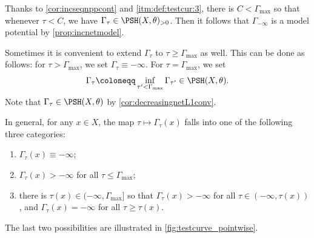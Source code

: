 Thanks to \cref{cor:incseqnppcont} and \ref{itm:def:testcur:3}, there is $C<\Gamma_{\max}$ so that whenever $\tau<C$, we have $\Gamma_{\tau}\in \PSH(X,\theta)_{>0}$. Then it follows that $\Gamma_{-\infty}$ is a model potential by \cref{prop:incnetmodel}.

\begin{remark}\label{rmk:extendtestcur}
    Sometimes it is convenient to extend $\Gamma_{\tau}$ to $\tau\geq \Gamma_{\max}$ as well. This can be done as follows: for $\tau>\Gamma_{\max}$, we set $\Gamma_{\tau}\equiv -\infty$. For $\tau=\Gamma_{\max}$, we set
    \[
        \Gamma_{\tau}\coloneqq \inf_{\tau'<\Gamma_{\max}}\Gamma_{\tau'}\in \PSH(X,\theta).
    \]
    Note that $\Gamma_{\tau}\in \PSH(X,\theta)$ by \cref{cor:decreasingnetL1conv}.
\end{remark}

In general, for any $x\in X$, the map $\tau\mapsto \Gamma_{\tau}(x)$ falls into one of the following three categories:
\begin{enumerate}
    \item\label{itm:Gammataux_1} $\Gamma_{\tau}(x)\equiv -\infty$;
    \item\label{itm:Gammataux_2} $\Gamma_{\tau}(x)>-\infty$ for all $\tau\leq \Gamma_{\max}$;
    \item\label{itm:Gammataux_3} there is $\tau(x)\in (-\infty,\Gamma_{\max}]$ so that $\Gamma_{\tau}(x)>-\infty$ for all $\tau \in (-\infty,\tau(x))$, and $\Gamma_{\tau}(x)=-\infty$ for all $\tau\geq \tau(x)$.
\end{enumerate}
The last two possibilities are illustrated in \cref{fig:testcurve_pointwise}.


